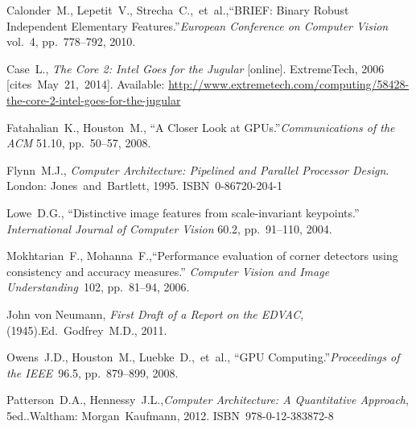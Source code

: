 {\raggedright
	\begin{thebibliography}{99}
		
			Calonder~M., Lepetit~V., Strecha~C.,~et~al.,\linebreak[1]
			``BRIEF: Binary Robust Independent Elementary Features.''\linebreak[1]
			\textit{European Conference on Computer Vision} vol.~4, pp.~778--792,
			2010.
		
			Case~L.,
			\textit{The Core 2: Intel Goes for the Jugular} [online].
			ExtremeTech, 2006 [cites~May~21,~2014].
			Available: \url{http://www.extremetech.com/computing/58428-the-core-2-intel-goes-for-the-jugular}
		
			Fatahalian~K., Houston~M.,
			``A Closer Look at GPUs.''\linebreak[1]
			\textit{Communications of the ACM} 51.10, pp.~50--57, 2008.
		
			Flynn~M.J.,
			\textit{Computer Architecture: Pipelined and Parallel Processor Design}.
			\linebreak[3]
			London: Jones~and~Bartlett, 1995. ISBN~0-86720-204-1
		
			Lowe~D.G.,
			``Distinctive image features from scale-invariant keypoints.''
			\textit{International Journal of Computer Vision} 60.2,
			pp.~91--110, 2004.
		
			Mokhtarian~F., Mohanna~F.,\linebreak[1]
			``Performance evaluation of corner detectors using
			consistency and accuracy measures.''
			\textit{Computer Vision and Image Understanding}~102, pp.~81--94, 2006.
		
			John von Neumann,
			\textit{First Draft of a Report on the EDVAC}, (1945).\linebreak[2]
			Ed.~Godfrey~M.D., 2011.
		
			Owens~J.D., Houston~M., Luebke~D.,~et~al.,
			``GPU Computing.''\linebreak[1]
			\textit{Proceedings of the IEEE}~96.5, pp.~879--899,
			2008.
		
			Patterson~D.A., Hennessy~J.L.,\linebreak[1]
			\textit{Computer Architecture: A Quantitative Approach},
				5\nth ed..\linebreak[1]
			Waltham: Morgan~Kaufmann, 2012. ISBN~978-0-12-383872-8
		

\end{thebibliography}}
